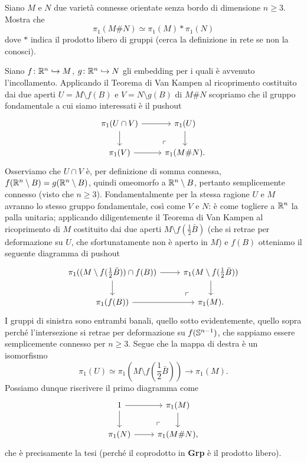 \documentclass[a4paper]{article}
\begin{document}
\begin{ex}[5.6]{Siano $ M $ e $ N $ due varietà connesse orientate senza bordo di dimensione $ n \geq 3 $. Mostra che
		$$  \pi_1(M \# N) \simeq \pi_1(M) \ast \pi_1(N)  $$
		dove $ \ast $ indica il prodotto libero di gruppi (cerca la definizione in rete se non la conosci).}
	
	Siano $ f\colon \R^n \hookrightarrow M $, $ g\colon \R^n \hookrightarrow N $ gli embedding per i quali è avvenuto l'incollamento. Applicando il Teorema di Van Kampen al ricoprimento costituito dai due aperti $ U = M \setminus f(B) $ e $ V = N\setminus g(B) $ di $ M \# N $ scopriamo che il gruppo fondamentale a cui siamo interessati è il pushout
	\[ \begin{tikzcd}
	\pi_1(U \cap V) \rar\dar\arrow[dr, phantom, "\ulcorner", very near end] & \pi_1(U) \dar \\
	\pi_1(V) \rar & \pi_1(M \# N).
	\end{tikzcd} \]
	Osserviamo che $ U \cap V $ è, per definizione di somma connessa, $ f(\R^n \setminus B) = g(\R^n \setminus B) $, quindi omeomorfo a $ \R^n \setminus B $, pertanto semplicemente connesso (visto che $ n \geq 3 $). Fondamentalmente per la stessa ragione $ U $ e $ M $ avranno lo stesso gruppo fondamentale, così come $ V $ e $ N $: è come togliere a $ \R^n $ la palla unitaria; applicando diligentemente il Teorema di Van Kampen al ricoprimento di $ M $ costituito dai due aperti $ M \setminus f(\frac{1}{2}\bar{B}) $ (che si retrae per deformazione su $ U $, che sfortunatamente non è aperto in $ M $) e $ f(B) $ otteniamo il seguente diagramma di pushout
	\[ \begin{tikzcd}
	\pi_1((M \setminus f(\frac{1}{2}\bar{B})) \cap f(B)) \rar\dar\arrow[dr, phantom, "\ulcorner", very near end] & \pi_1(M \setminus f(\frac{1}{2}\bar{B})) \dar \\
	\pi_1(f(B)) \rar & \pi_1(M).
	\end{tikzcd} \]
	I gruppi di sinistra sono entrambi banali, quello sotto evidentemente, quello sopra perché l'intersezione si retrae per deformazione su $ f(\S^{n-1}) $, che sappiamo essere semplicemente connesso per $ n\geq 3 $. Segue che la mappa di destra è un isomorfismo
	\[ \pi_1(U) \simeq \pi_1(M \setminus f(\frac{1}{2}\bar{B})) \to \pi_1(M). \]
	Possiamo dunque riscrivere il primo diagramma come
	\[ \begin{tikzcd}
	1 \rar\dar\arrow[dr, phantom, "\ulcorner", very near end] & \pi_1(M) \dar \\
	\pi_1(N) \rar & \pi_1(M \# N),
	\end{tikzcd} \]
	che è precisamente la tesi (perché il coprodotto in \textbf{Grp} è il prodotto libero).
	
\end{ex}
\end{document}
